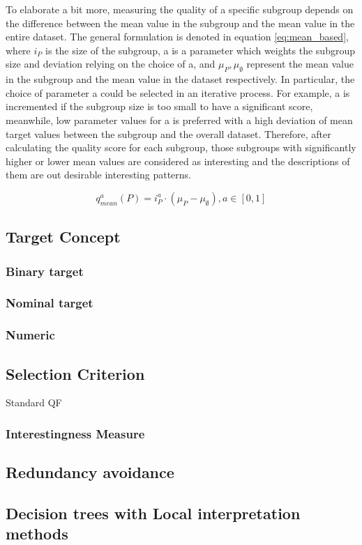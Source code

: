 To elaborate a bit more, measuring the quality of a specific subgroup depends on the difference between the mean value in the subgroup and the mean value in the entire dataset. The general formulation is denoted in equation \ref{eq:mean_based}, where $i_{P}$ is the size of the subgroup, a is a parameter which weights the subgroup size and deviation relying on the choice of a, and $\mu_{P}, \mu_{\emptyset}$ represent the mean value in the subgroup and the mean value in the dataset respectively. In particular, the choice of parameter a could be selected in an iterative process. For example, a is incremented if the subgroup size is too small to have a significant score, meanwhile, low parameter values for a is preferred with a high deviation of mean target values between the subgroup and the overall dataset. Therefore, after calculating the quality score for each subgroup, those subgroups with significantly higher or lower mean values are considered as interesting and the descriptions of them are out desirable interesting patterns. 

\begin{equation}  \label{eq:mean_based}
q_{m e a n}^{a}(P)=i_{P}^{a} \cdot\left(\mu_{P}-\mu_{\emptyset}\right), a \in[0,1]
\end{equation}





\subsection{Target Concept}

	\subsubsection{Binary target}
	\subsubsection{Nominal target}
	\subsubsection{Numeric}

\subsection{Selection Criterion}
Standard QF
\subsubsection{Interestingness Measure}
	
\subsection{Redundancy avoidance}

\subsection{Decision trees with Local interpretation methods}
